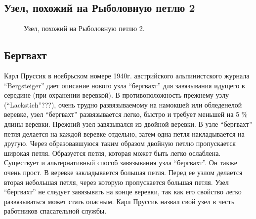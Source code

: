 \subsection{Узел, похожий на Рыболовную петлю 2}

\begin{figure}[H]\centering
	\subfloat[Завязывание]{\label{ris:Fish_Loop_seem_2_1}
	\tcbox[enhanced jigsaw,colframe=black,opacityframe=0.5,opacityback=0.5]
		{\centering
			}
		}
\end{figure}

\begin{figure}[H]\centering
	\subfloat[Результат]{\label{ris:Fish_Loop_seem_2_2}
	\tcbox[enhanced jigsaw,colframe=black,opacityframe=0.5,opacityback=0.5]
		{\centering
			}
		}
\end{figure}

\begin{figure}[H]\centering
	\caption{Узел, похожий на Рыболовную петлю 2.}\label{ris:Fish_Loop_seem_2}
\end{figure}


\subsection{Бергвахт}

Карл Пруссик в ноябрьском номере 1940г. австрийского альпинистского журнала \enquote{Bergsteiger} дает описание нового узла \enquote{бергвахт} для завязывания идущего в середине (при охранении веревкой). В противоположность прежнему узлу (\enquote{Lackstich}???), очень трудно развязываемому на намокшей или обледенелой веревке, узел \enquote{бергвахт} развязывается легко, быстро и требует меньшей на 5 \% длины веревки. Прежний узел завязывался из двойной веревки. В узле \enquote{бергвахт} петля делается на каждой веревке отдельно, затем одна петля накладывается на другую. Через образовавшуюся таким образом двойную петлю пропускается широкая петля. Образуется петля, которая может быть легко ослаблена. Существует и альтернативный способ завязывания узла \enquote{бергвахт}. Он также очень прост. В веревке закладывается большая петля. Перед ее узлом делается вторая небольшая петля, через которую пропускается большая петля. Узел \enquote{бергвахт} не следует завязывать на конце веревки, так как его свойство легко развязываться может стать опасным. Карл Пруссик назвал свой узел в честь работников спасательной службы.

